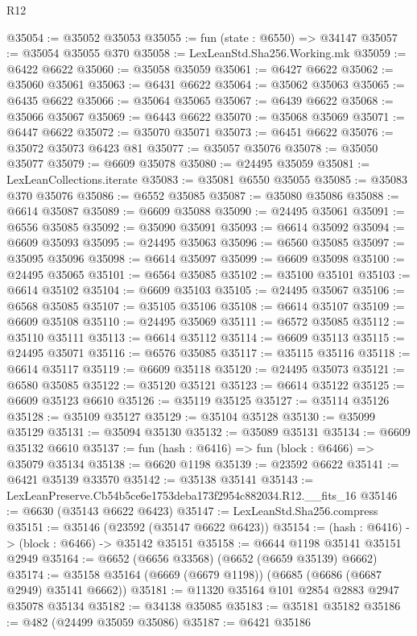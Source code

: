 \begin{lexlean}{R12}
\begin{coremodule}
@35054 := @35052 @35053
@35055 := fun (state : @6550) => @34147
@35057 := @35054 @35055 @370
@35058 := LexLeanStd.Sha256.Working.mk
@35059 := @6422 @6622
@35060 := @35058 @35059
@35061 := @6427 @6622
@35062 := @35060 @35061
@35063 := @6431 @6622
@35064 := @35062 @35063
@35065 := @6435 @6622
@35066 := @35064 @35065
@35067 := @6439 @6622
@35068 := @35066 @35067
@35069 := @6443 @6622
@35070 := @35068 @35069
@35071 := @6447 @6622
@35072 := @35070 @35071
@35073 := @6451 @6622
@35076 := @35072 @35073 @6423 @81
@35077 := @35057 @35076
@35078 := @35050 @35077
@35079 := @6609 @35078
@35080 := @24495 @35059
@35081 := LexLeanCollections.iterate
@35083 := @35081 @6550 @35055
@35085 := @35083 @370 @35076
@35086 := @6552 @35085
@35087 := @35080 @35086
@35088 := @6614 @35087
@35089 := @6609 @35088
@35090 := @24495 @35061
@35091 := @6556 @35085
@35092 := @35090 @35091
@35093 := @6614 @35092
@35094 := @6609 @35093
@35095 := @24495 @35063
@35096 := @6560 @35085
@35097 := @35095 @35096
@35098 := @6614 @35097
@35099 := @6609 @35098
@35100 := @24495 @35065
@35101 := @6564 @35085
@35102 := @35100 @35101
@35103 := @6614 @35102
@35104 := @6609 @35103
@35105 := @24495 @35067
@35106 := @6568 @35085
@35107 := @35105 @35106
@35108 := @6614 @35107
@35109 := @6609 @35108
@35110 := @24495 @35069
@35111 := @6572 @35085
@35112 := @35110 @35111
@35113 := @6614 @35112
@35114 := @6609 @35113
@35115 := @24495 @35071
@35116 := @6576 @35085
@35117 := @35115 @35116
@35118 := @6614 @35117
@35119 := @6609 @35118
@35120 := @24495 @35073
@35121 := @6580 @35085
@35122 := @35120 @35121
@35123 := @6614 @35122
@35125 := @6609 @35123 @6610
@35126 := @35119 @35125
@35127 := @35114 @35126
@35128 := @35109 @35127
@35129 := @35104 @35128
@35130 := @35099 @35129
@35131 := @35094 @35130
@35132 := @35089 @35131
@35134 := @6609 @35132 @6610
@35137 := fun (hash : @6416) => fun (block : @6466) => @35079 @35134
@35138 := @6620 @1198
@35139 := @23592 @6622
@35141 := @6421 @35139 @33570
@35142 := @35138 @35141
@35143 := LexLeanPreserve.Cb54b5ce6e1753deba173f2954c882034.R12.__fits_16
@35146 := @6630 (@35143 @6622 @6423)
@35147 := LexLeanStd.Sha256.compress
@35151 := @35146 (@23592 (@35147 @6622 @6423))
@35154 := (hash : @6416) -> (block : @6466) -> @35142 @35151
@35158 := @6644 @1198 @35141 @35151 @2949
@35164 := @6652 (@6656 @33568) (@6652 (@6659 @35139) @6662)
@35174 := @35158 @35164 (@6669 (@6679 @1198)) (@6685 (@6686 (@6687 @2949) @35141 @6662))
@35181 := @11320 @35164 @101 @2854 @2883 @2947 @35078 @35134
@35182 := @34138 @35085
@35183 := @35181 @35182
@35186 := @482 (@24499 @35059 @35086)
@35187 := @6421 @35186

\end{coremodule}
\end{lexlean}
